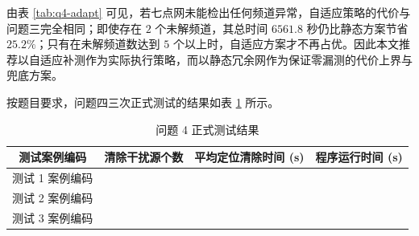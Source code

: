 由表 \ref{tab:q4-adapt} 可见，若七点网未能检出任何频道异常，自适应策略的代价与问题三完全相同；即使存在 $2$ 个未解频道，其总时间 $6561.8$ 秒仍比静态方案节省 $25.2\%$；只有在未解频道数达到 $5$ 个以上时，自适应方案才不再占优。因此本文推荐以自适应补测作为实际执行策略，而以静态冗余网作为保证零漏测的代价上界与兜底方案。

按题目要求，问题四三次正式测试的结果如表 \ref{tab:q4-test} 所示。

\begin{table}[H]
	\centering
	\caption{问题 4 正式测试结果}
	\label{tab:q4-test}
	\begin{tabular}{cccc}
		\toprule
		测试案例编码 & 清除干扰源个数 & 平均定位清除时间 (s) & 程序运行时间 (s) \\
		\midrule
		测试 1 案例编码 & & & \\
		测试 2 案例编码 & & & \\
		测试 3 案例编码 & & & \\
		\bottomrule
	\end{tabular}
\end{table}
